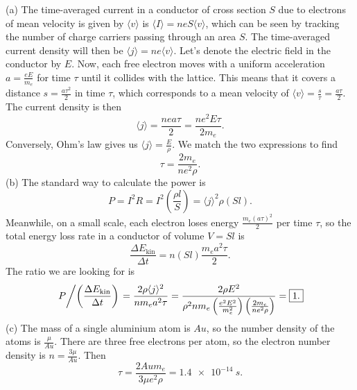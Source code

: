 \documentclass[../TST.tex]{subfiles}
\begin{document}
\ifprob \else
\begin{solution} (a) The time-averaged current in a conductor of cross section $S$ due to electrons of mean velocity is given by $\langle v \rangle$ is $\langle I\rangle=neS\langle v \rangle$, which can be seen by tracking the number of charge carriers passing through an area $S$. The time-averaged current density will then be $\langle j \rangle = ne \langle v \rangle$. Let's denote the electric field in the conductor by $E$. Now, each free electron moves with a uniform acceleration $a=\frac{eE}{m_e}$ for time $\tau$ until it collides with the lattice. This means that it covers a distance $s=\frac{a\tau^2}{2}$ in time $\tau$, which corresponds to a mean velocity of $\langle v \rangle=\frac{s}{\tau}=\frac{a\tau}{2}$. The current density is then 
\begin{equation*}
	\langle j \rangle=\frac{nea\tau}{2}= \frac{ne^2 E \tau}{2m_e}.
\end{equation*}
	Conversely, Ohm's law gives us $ \langle j \rangle = \frac{E}{\rho}$. We match the two expressions to find
	\begin{equation*}
		\boxed{\tau=\frac{2m_e}{ne^2\rho}.}
	\end{equation*}
(b) The standard way to calculate the power is
\begin{equation*}
P=I^2R=I^2\left(\frac{\rho l}{S}\right)=\langle j \rangle^2 \rho (Sl)
.
\end{equation*}
Meanwhile, on a small scale, each electron loses energy $\frac{m_e (a\tau)^2}{2}$ per time $\tau$, so the total energy loss rate in a conductor of volume $V=Sl$ is
\begin{equation*}
\frac{\Delta E_\mathrm{kin}}{\Delta t}=n(Sl) \frac{m_ea^2\tau}{2}
.
\end{equation*}
The ratio we are looking for is
\begin{equation*}
	\left. P \middle/ \left( \frac{\Delta E_\mathrm{kin}}{\Delta t}\right) \right. = \frac{2\rho \langle j \rangle^2}{nm_ea^2\tau} = \frac{2\rho E^2}{\rho^2nm_e \left( \frac{e^2E^2}{m_e^2}\right)\left(\frac{2m_e}{ne^2\rho}\right)} = \boxed{1.}
\end{equation*}
(c) The mass of a single aluminium atom is $Au$, so the number density of the atoms is $\frac{\mu}{Au}$. There are three free electrons per atom, so the electron number density is $n=\frac{3\mu}{Au}$. Then
\begin{equation*}
	\boxed{\tau=\frac{2Au m_e}{3\mu e^2\rho}=\qty{1.4e-14}{s}.} 
\end{equation*}

\end{solution}
\fi
\end{document}

